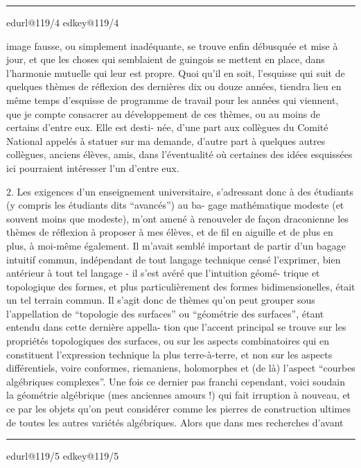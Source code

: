 \documentclass[11pt,a4paper]{article}
\makeatletter
\newif\ifreading
\newif\ifenglish
\def\CurrentScanURL{}
\def\CurrentPageKey{}
\def\CurrentApparatus{}
\newcommand{\scanpage}[1]{%
  \clearpage
  \expandafter\let\expandafter\CurrentScanURL\csname edurl@#1\endcsname
  \expandafter\let\expandafter\CurrentPageKey\csname edkey@#1\endcsname
  \def\CurrentApparatus{}%
  \hypertarget{scan-\CurrentPageKey}{}%
  \typeout{EDITION-SCAN: \CurrentPageKey; PDFPAGE: \the\numexpr\ReadonlyShipoutCounter+1\relax}%
  \ifreading
    \marginnote{\raggedright\scriptsize\sffamily\href{\CurrentScanURL}{119 / \csname edpage@#1\endcsname}}%
  \else
    \noindent{\small\sffamily\href{\CurrentScanURL}{[scan #1]}}\par\smallskip
  \fi}
\newcommand{\mspage}[1]{%
  \ifreading\marginnote{\raggedright\scriptsize\sffamily p.\,#1}[2\baselineskip]%
  \else\noindent{\small\sffamily[p.\,#1]}\par\smallskip\fi}
\newcommand{\margin}[1]{%
  \sbox{\MarginalTestBox}{\parbox{\marginparwidth}{\raggedright\footnotesize#1}}%
  \ifdim\dimexpr\ht\MarginalTestBox+\dp\MarginalTestBox\relax>3\baselineskip
    \par\smallskip\noindent\begin{minipage}{\linewidth}\hrule\smallskip
    {\footnotesize\textcolor{HandInk}{\ifenglish Marginal note:\else Note marginale :\fi\ #1}}\smallskip\hrule\end{minipage}\par\smallskip
  \else
    \marginnote{\raggedright\footnotesize\textcolor{HandInk}{#1}}%
  \fi}
\newcommand{\finishscan}{\ifx\CurrentApparatus\empty\else\par\bigskip\noindent\rule{.35\linewidth}{.35pt}\par\smallskip{\footnotesize\setlength{\parskip}{3pt}\CurrentApparatus}\fi}
\makeatother
\begin{document}
\margin{3}

\finishscan
\scanpage{119/4}
\mspage{2}

image fausse, ou simplement inadéquante, se trouve enfin débusquée
et mise à jour, et que les choses qui semblaient de guingois se
mettent en place, dans l'harmonie mutuelle qui leur est propre.
\qquad Quoi qu'il en soit, l'esquisse qui suit de quelques
thèmes de réflexion des dernières dix ou douze années, tiendra
lieu en même temps d'esquisse de programme de travail pour les
années qui viennent, que je compte consacrer au développement de
ces thèmes, ou au moins de certains d'entre eux. Elle est desti-%
née, d'une part aux collègues du Comité National appelés à statuer
sur ma demande, d'autre part à quelques autres collègues, anciens
élèves, amis, dans l'éventualité où certaines des idées esquissées
ici pourraient intéresser l'un d'entre eux.

2. \qquad Les exigences d'un enseignement universitaire, s'adressant
donc à des étudiants (y compris les étudiants dits ``avancés'') au ba-%
gage mathématique modeste (et souvent moins que modeste), m'ont amené
à renouveler de façon draconienne les thèmes de réflexion à proposer
à mes élèves, et de fil en aiguille et de plus en plus, à moi-même
également. Il m'avait semblé important de partir d'un bagage intuitif
commun, indépendant de tout langage technique censé l'exprimer, bien
antérieur à tout tel langage - il s'est avéré que l'intuition géomé-%
trique et topologique des formes, et plus particulièrement des formes
bidimensionelles, était un tel terrain commun. Il s'agit donc de thèmes
qu'on peut grouper sous l'appellation de ``topologie des surfaces'' ou
``géométrie des surfaces'', étant entendu dans cette dernière appella-%
tion que l'accent principal se trouve sur les propriétés topologiques
des surfaces, ou sur les aspects combinatoires qui en constituent
l'expression technique la plus terre-à-terre, et non sur les aspects
différentiels, voire conformes, riemaniens, holomorphes et (de là)
l'aspect ``courbes algébriques complexes''. Une fois ce dernier pas
franchi cependant, voici soudain la géométrie algébrique (mes anciennes
amours !) qui fait irruption à nouveau, et ce par les objets qu'on
peut considérer comme les pierres de construction ultimes de toutes
les autres variétés algébriques. Alors que dans mes recherches d'avant

\margin{4}

\finishscan
\scanpage{119/5}
\mspage{3}
\end{document}
